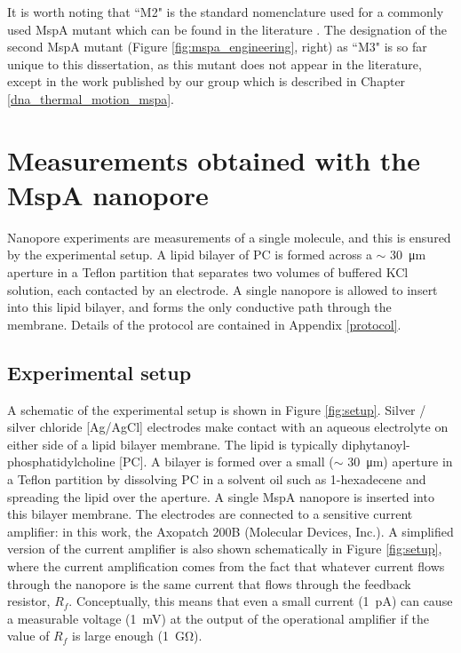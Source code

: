 It is worth noting that ``M2" is the standard nomenclature used for a commonly used MspA mutant which can be found in the literature \citep{Butler2008,Manrao2012,Schreiber2013,Derrington2015}.  The designation of the second MspA mutant (Figure \ref{fig:mspa_engineering}, right) as ``M3" is so far unique to this dissertation, as this mutant does not appear in the literature, except in the work published by our group \citep{Lu2015,Fleming2017} which is described in Chapter \ref{dna_thermal_motion_mspa}.


\section{Measurements obtained with the MspA nanopore}

Nanopore experiments are measurements of a single molecule, and this is ensured by the experimental setup.  A lipid bilayer of PC is formed across a $\sim$ \SI{30}{\um} aperture in a Teflon partition that separates two volumes of buffered KCl solution, each contacted by an electrode.  A single nanopore is allowed to insert into this lipid bilayer, and forms the only conductive path through the membrane.  Details of the protocol are contained in Appendix \ref{protocol}.

\subsection{Experimental setup}
\label{experimental_setup}

A schematic of the experimental setup is shown in Figure \ref{fig:setup}.  Silver / silver chloride [Ag/AgCl] electrodes make contact with an aqueous electrolyte on either side of a lipid bilayer membrane.  The lipid is typically diphytanoyl-phosphatidylcholine [PC].  A bilayer is formed over a small ($\sim$ \SI{30}{\um}) aperture in a Teflon partition by dissolving PC in a solvent oil such as 1-hexadecene and spreading the lipid over the aperture.  A single MspA nanopore is inserted into this bilayer membrane.  The electrodes are connected to a sensitive current amplifier: in this work, the Axopatch 200B (Molecular Devices, Inc.).  A simplified version of the current amplifier is also shown schematically in Figure \ref{fig:setup}, where the current amplification comes from the fact that whatever current flows through the nanopore is the same current that flows through the feedback resistor, $R_f$.  Conceptually, this means that even a small current (\SI{1}{\pA}) can cause a measurable voltage (\SI{1}{\mV}) at the output of the operational amplifier if the value of $R_f$ is large enough (\SI{1}{\giga\ohm}).

